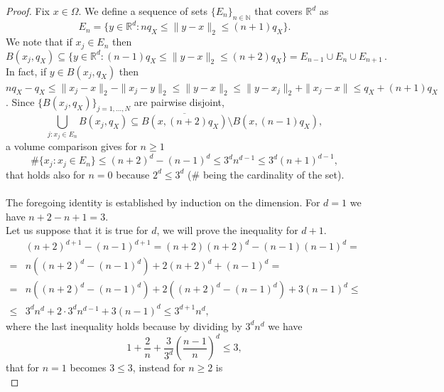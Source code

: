 \documentclass{drna}
\begin{document}
\begin{proof}
Fix $x \in \Omega$. We define a sequence of sets $\{E_n\}_{n \in \mathbb{N}}$ that covers $\mathbb{R}^d$ as
\begin{equation*}
    E_n = \{ y \in \mathbb{R}^d: n q_X \leq \|y-x\|_2 \leq (n+1)q_X\}.
\end{equation*}
We note that if $x_j \in E_n$ then
\begin{equation*}
    B(x_j,q_X) \subseteq \{ y \in \mathbb{R}^d: (n-1)q_X \leq \|y-x\|_2 \leq (n+2)q_X\}=E_{n-1}\cup E_n \cup E_{n+1}\,.
\end{equation*}
In fact, if $y \in B(x_j,q_X)$ then $nq_X -q_X \leq \|x_j-x\|_2-\|x_j-y\|_2 \leq\|y-x\|_2 \leq \|y-x_j\|_2+\|x_j-x\| \leq q_X +(n+1)q_X$.
Since $\{B(x_j,q_X)\}_{j=1,\dots,N}$ are pairwise disjoint,
\begin{equation*}
    \bigcup_{j : x_j \in E_n} B(x_j,q_X) \subseteq \overline{B(x,(n+2)q_X)} \setminus B(x,(n-1)q_X),
\end{equation*}
a volume comparison gives for $n \geq 1$
\begin{equation*}
    \# \{x_j : x_j \in E_n\} \leq (n+2)^d-(n-1)^d \leq 3^d n^{d-1} \leq 3^d(n+1)^{d-1},
\end{equation*}
that holds also for $n=0$ because $2^d \leq 3^d$ ($\#$ being the cardinality of the set).
\\
\\
The foregoing identity is established by induction on the dimension. For $d=1$ we have $n+2-n+1=3$. 
\\ Let us suppose that it is true for $d$, we will prove the inequality for $d+1$.
\begin{equation*}
    \begin{split}
        &(n+2)^{d+1}-(n-1)^{d+1} = (n+2)(n+2)^d-(n-1)(n-1)^d = \\
        = & n((n+2)^d-(n-1)^d)+2(n+2)^d+(n-1)^d = \\
        = & n((n+2)^d-(n-1)^d) +2((n+2)^d-(n-1)^d)+3(n-1)^d \leq\\
        \leq & 3^dn^d+2 \cdot3^dn^{d-1}+3(n-1)^d \leq 3^{d+1}n^d,
    \end{split}
\end{equation*}
where the last inequality holds because by dividing by $3^dn^d$ we have
\begin{equation*}
    1+\frac{2}{n}+ \frac{3}{3^d}\left(\frac{n-1}{n}\right)^d \leq 3,
\end{equation*}
that for $n=1$ becomes $3 \leq 3$, instead for $n\geq 2$ is 
\begin{equation*}

\end{equation*}
\end{proof}
\end{document}
